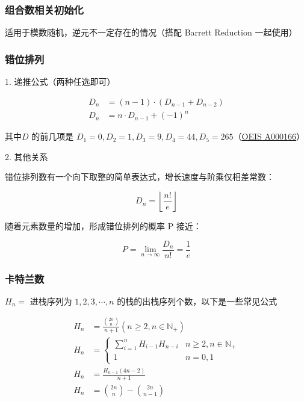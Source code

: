 \documentclass[12pt]{article}
\begin{document}


\newpage

\subsubsection{组合数相关初始化}

适用于模数随机，逆元不一定存在的情况（搭配 Barrett Reduction 一起使用）



\newpage

\subsubsection{错位排列}

1. 递推公式（两种任选即可）

$$
\begin{aligned}
	D_{n}&=(n-1)\cdot(D_{n-1}+D_{n-2})\\
	D_{n}&=n\cdot D_{n-1}+(-1)^{n}
\end{aligned}
$$

其中$D$ 的前几项是 $D_1=0, D_2=1, D_3=9, D_4=44, D_5=265 $（\href{http://oeis.org/A000166}{OEIS A000166}）

2. 其他关系

错位排列数有一个向下取整的简单表达式，增长速度与阶乘仅相差常数：

$$
D_n=\left\lfloor\frac{n!}{e}\right\rfloor
$$

随着元素数量的增加，形成错位排列的概率 P 接近：

$$
P=\lim_{n\to\infty}\frac{D_n}{n!}=\frac{1}{e}
$$

\subsubsection{卡特兰数}

$H_n=$ 进栈序列为 $1,2,3,\cdots,n$ 的栈的出栈序列个数，以下是一些常见公式

$$
\begin{aligned}
	H_{n}&=\frac{\binom{2n}{n}}{n+1}(n\ge2,n\in\mathbb{N}_{+})\\
	H_{n}&=
	\begin{cases}
		\sum_{i=1}^{n}H_{i-1}H_{n-i} & n\ge2,n\in\mathbb{N}_{+}\\
		1 & n=0,1
	\end{cases}\\
	H_{n}&=\frac{H_{n-1}(4n-2)}{n+1}\\
	H_{n}&=\binom{2n}{n}-\binom{2n}{n-1}
\end{aligned}
$$
\end{document}
